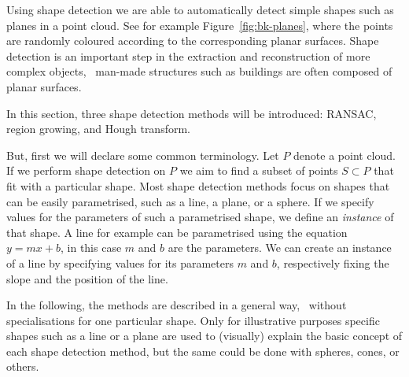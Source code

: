 Using shape detection we are able to automatically detect simple shapes such as planes in a point cloud.
See for example Figure~\ref{fig:bk-planes}, where the points are randomly coloured according to the corresponding planar surfaces.
Shape detection is an important step in the extraction and reconstruction of more complex objects, \eg\ man-made structures such as buildings are often composed of planar surfaces.

In this section, three shape detection methods will be introduced: RANSAC, region growing, and Hough transform.


But, first we will declare some common terminology.
Let $P$ denote a point cloud. 
If we perform shape detection on $P$ we aim to find a subset of points $S \subset P$ that fit with a particular shape. 
Most shape detection methods focus on shapes that can be easily parametrised, such as a line, a plane, or a sphere. 
If we specify values for the parameters of such a parametrised shape, we define an \emph{instance} of that shape.
A line for example can be parametrised using the equation $y = mx + b$, in this case $m$ and $b$ are the parameters.
We can create an instance of a line by specifying values for its parameters $m$ and $b$, respectively fixing the slope and the position of the line.

In the following, the methods are described in a general way, \ie\ without specialisations for one particular shape.
Only for illustrative purposes specific shapes such as a line or a plane are used to (visually) explain the basic concept of each shape detection method, but the same could be done with spheres, cones, or others.




